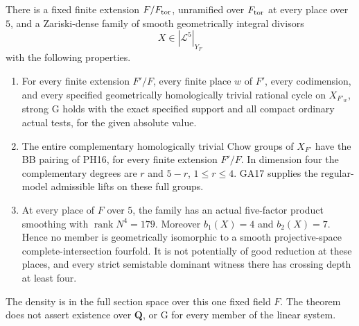 \begin{theorem}
\label{r18sg:height-family}
There is a fixed finite extension \(F/F_{\rm tor}\),
unramified over \(F_{\rm tor}\) at every place over \(5\),
and a Zariski-dense family of smooth geometrically
integral divisors
\[
                     X\in|\mathcal L^5|_{Y_F}
 \tag{SG18.5}\label{r18sg:linear-system}
\]
with the following properties.
\begin{enumerate}
\item For every finite extension \(F'/F\), every finite
      place \(w\) of \(F'\), every codimension, and every
      specified geometrically homologically trivial
      rational cycle on \(X_{F'_w}\), strong G holds
      with the exact specified support and all compact
      ordinary actual tests, for the given absolute value.
\item The entire complementary homologically trivial
      Chow groups of \(X_{F'}\) have the BB pairing of
      PH16, for every finite extension \(F'/F\).
      In dimension four the complementary degrees are
      \(r\) and \(5-r\), \(1\le r\le4\).
      GA17 supplies the regular-model admissible lifts
      on these full groups.
\item At every place of \(F\) over \(5\), the family has
      an actual five-factor product smoothing with
      \(\operatorname{rank}N^4=179\).
      Moreover \(b_1(X)=4\) and \(b_2(X)=7\).
      Hence no member is geometrically isomorphic to
      a smooth projective-space complete-intersection
      fourfold.  It is not potentially of good reduction
      at these places, and every strict semistable
      dominant witness there has crossing depth at
      least four.
\end{enumerate}
The density is in the full section space over this one
fixed field \(F\).  The theorem does not assert existence
over \(\mathbf Q\), or G for every member of the linear
system.
\end{theorem}

